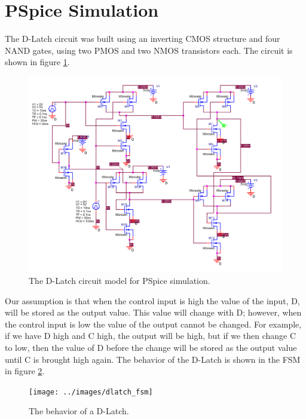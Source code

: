\section{PSpice Simulation}
The D-Latch circuit was built using an inverting CMOS structure and four NAND gates, using two PMOS and two NMOS transistors each. The circuit is shown in figure \ref{fig:spicecircuit}.
\begin{figure}[h!]
	\centering
	\includegraphics[width=1\linewidth]{../images/spice_circuit}
	\caption{The D-Latch circuit model for PSpice simulation.}
	\label{fig:spicecircuit}
\end{figure}

Our assumption is that when the control input is high the value of the input, D, will be stored as the output value. This value will change with D; however, when the control input is low the value of the output cannot be changed. For example, if we have D high and C high, the output will be high, but if we then change C to low, then the value of D before the change will be stored as the output value until C is brought high again. The behavior of the D-Latch is shown in the FSM in figure \ref{fig:dlatch_fsm}.


\FloatBarrier

\begin{figure}[h!]
	\centering
	\texttt{[image: ../images/dlatch\_fsm]}
	\caption{The behavior of a D-Latch.}
	\label{fig:dlatch_fsm}
\end{figure}

\FloatBarrier





